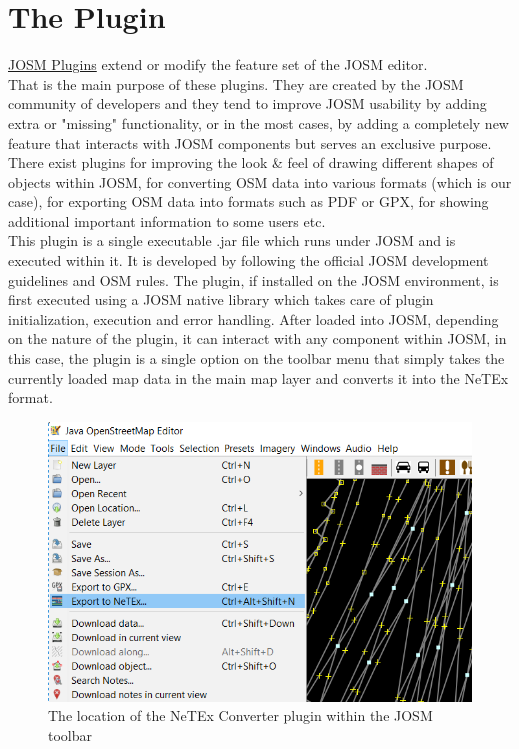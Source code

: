\section{The Plugin}
\label{sec:ThePlugin}
\href{https://wiki.openstreetmap.org/wiki/JOSM/Plugins}{JOSM Plugins} extend or modify the feature set of the JOSM editor. \cite{JOSMPlugins}\\
That is the main purpose of these plugins. They are created by the JOSM community of developers and they tend to improve JOSM usability by adding extra or "missing" functionality, or in the most cases, by adding a completely new feature that interacts with JOSM components but serves an exclusive purpose.\\
There exist plugins for improving the look \& feel of drawing different shapes of objects within JOSM, for converting OSM data into various formats (which is our case), for exporting OSM data into formats such as PDF or GPX, for showing additional important information to some users etc.\\
\newline
This plugin is a single executable .jar file which runs under JOSM and is executed within it. It is developed by following the official JOSM development guidelines and OSM rules. The plugin, if installed on the JOSM environment, is first executed using a JOSM native library which takes care of plugin initialization, execution and error handling. After loaded into JOSM, depending on the nature of the plugin, it can interact with any component within JOSM, in this case, the plugin is a single option on the toolbar menu that simply takes the currently loaded map data in the main map layer and converts it into the NeTEx format. \\
\begin{figure}[H]
	\includegraphics[width=\linewidth]{./Images/ArchitectureDesign/netex_converter_toolbar.png}
	\caption{The location of the NeTEx Converter plugin within the JOSM toolbar}
\end{figure}
